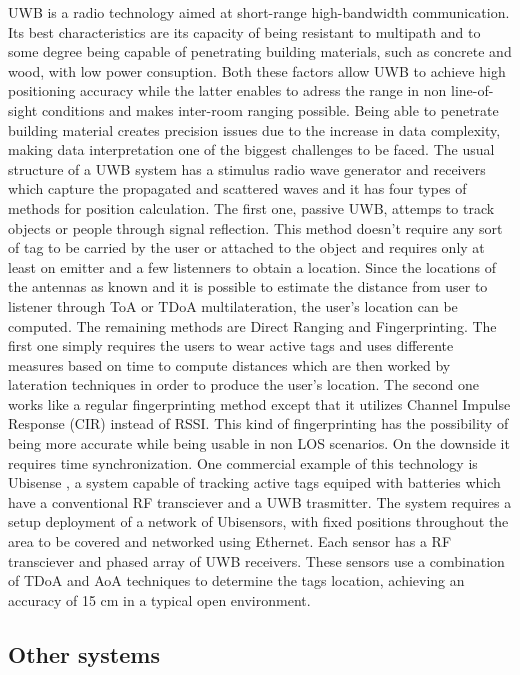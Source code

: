 \ac{UWB} is a radio technology aimed at short-range high-bandwidth communication. Its best characteristics are its capacity of being resistant to multipath and to some degree being capable of penetrating building materials, such as concrete and wood, with low power consuption. Both these factors allow \ac{UWB} to achieve high positioning accuracy while the latter enables to adress the range in non line-of-sight conditions and makes inter-room ranging possible. Being able to penetrate building material creates precision issues due to the increase in data complexity, making data interpretation one of the biggest challenges to be faced. The usual structure of a \ac{UWB} system has a stimulus radio wave generator and receivers which capture the propagated and scattered waves and it has four types of methods for position calculation.
The first one, passive \ac{UWB}, attemps to track objects or people through signal reflection. This method doesn't require any sort of tag to be carried by the user or attached to the object and requires only at least on emitter and a few listenners to obtain a location. Since the locations of the antennas as known and it is possible to estimate the distance from user to listener through \ac{ToA} or \ac{TDoA} multilateration, the user's location can be computed.
The remaining methods are Direct Ranging and Fingerprinting. The first one simply requires the users to wear active tags and uses differente measures based on time to compute distances which are then worked by lateration techniques in order to produce the user's location. The second one works like a regular fingerprinting method except that it utilizes Channel Impulse Response (CIR) instead of \ac{RSSI}. This kind of fingerprinting has the possibility of being more accurate while being usable in non \ac{LOS} scenarios. On the downside it requires time synchronization.
One commercial example of this technology is Ubisense \cite{ubisense}, a system capable of tracking active tags equiped with batteries which have a conventional RF transciever and a \ac{UWB} trasmitter. The system requires a setup deployment of a network of Ubisensors, with fixed positions throughout the area to be covered and networked using Ethernet. Each sensor has a RF transciever and  phased array of \ac{UWB} receivers. These sensors use a combination of \ac{TDoA} and \ac{AoA} techniques to determine the tags location, achieving an accuracy of 15 cm in a typical open environment.



\subsection{Other systems}
\label{subsec:others}

